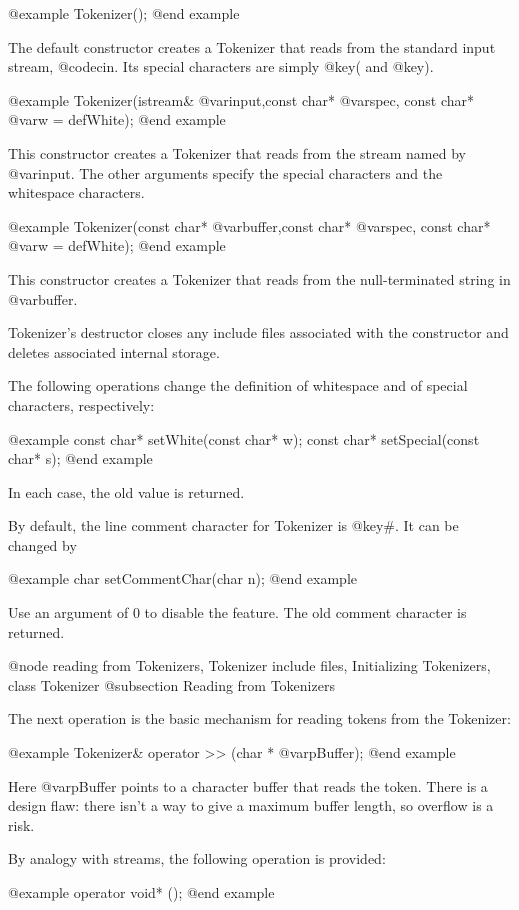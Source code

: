 @example
Tokenizer();
@end example

The default constructor creates a Tokenizer that reads from the
standard input stream, @code{cin}.  Its special characters are
simply @key{(} and @key{)}.

@example
Tokenizer(istream& @var{input},const char* @var{spec},
          const char* @var{w} = defWhite);
@end example

This constructor creates a Tokenizer that reads from the stream named
by @var{input}.  The other arguments specify the special characters
and the whitespace characters.

@example
Tokenizer(const char* @var{buffer},const char* @var{spec},
          const char* @var{w} = defWhite);
@end example

This constructor creates a Tokenizer that reads from the null-terminated
string in @var{buffer}.

Tokenizer's destructor closes any include files associated with the
constructor and deletes associated internal storage.

The following operations change the definition of whitespace and of
special characters, respectively:

@example
const char* setWhite(const char* w);
const char* setSpecial(const char* s);
@end example

In each case, the old value is returned.

By default, the line comment character for Tokenizer is @key{#}.
It can be changed by

@example
char setCommentChar(char n);
@end example

Use an argument of 0 to disable the feature.  The old comment character
is returned.

@node reading from Tokenizers, Tokenizer include files, Initializing Tokenizers, class Tokenizer
@subsection Reading from Tokenizers

The next operation is the basic mechanism for reading tokens from
the Tokenizer:

@example
Tokenizer& operator >> (char * @var{pBuffer});
@end example

Here @var{pBuffer} points to a character buffer that reads the token.
There is a design flaw: there isn't a way to give a maximum buffer
length, so overflow is a risk.

By analogy with streams, the following operation is provided:

@example
operator void* ();
@end example

